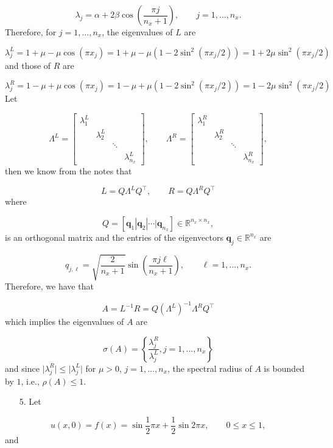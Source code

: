 \documentclass[12pt,a4paper]{article}
\begin{document}
\[
\lambda_j = \alpha + 2\beta\cos\left( \frac{\pi j}{n_x+1}  \right), \qquad j = 1, \ldots, n_x.
\]
Therefore, for $j = 1, \ldots, n_x$, the eigenvalues of $L$ are

\[
\lambda_j^{L} = 1 + \mu - \mu \cos\left(\pi x_j  \right) =  1 + \mu - \mu\left(1 - 2\sin^2\left(\pi x_j /2 \right)\right) = 1 + 2\mu\sin^2(\pi x_j/2)
\]
and those of $R$ are

\[
\lambda_j^{R} = 1 - \mu + \mu \cos\left(\pi x_j  \right) =  1 - \mu + \mu\left(1 - 2\sin^2\left(\pi x_j /2 \right)\right) = 1 - 2\mu\sin^2(\pi x_j/2)
\]
Let

\[
\Lambda^{L} = \begin{bmatrix}
\lambda_1^{L} & & & \\
& \lambda_2^{L} & & \\
 & & \ddots &  \\
&  & & \lambda_{n_x}^{L}
\end{bmatrix}, \qquad
\Lambda^{R} = \begin{bmatrix}
\lambda_1^{R} & & & \\
& \lambda_2^{R} & & \\
 & & \ddots &  \\
&  & & \lambda_{n_x}^{R}
\end{bmatrix},
\]
then we know from the notes that

\[
L = Q\Lambda^{L}Q^{\top}, \qquad R = Q\Lambda^{R}Q^{\top}
\]
where

\[
Q = \left[\mathbf{q}_1 |  \mathbf{q}_2 | \cdots | \mathbf{q}_{n_x}  \right] \in \mathbb{R}^{n_x \times n_x},
\]
is an orthogonal matrix and the entries of the eigenvectors $\mathbf{q}_j \in \mathbb{R}^{n_x}$ are

\[
q_{j,\ell} = \sqrt{\frac{2}{n_x+1}}\sin\left(\frac{\pi j \ell}{n_x+1}   \right), \qquad \ell = 1, \ldots, n_x.
\]
Therefore, we have that

\[
A = L^{-1}R = Q\left( \Lambda^{L}  \right)^{-1}\Lambda^{R}Q^{\top}
\]
which implies the eigenvalues of $A$ are

\[
\sigma(A) = \left\lbrace \frac{\lambda_j^{R}}{\lambda_j^{L}}, j = 1, \ldots, n_x    \right\rbrace
\]
and since $\vert \lambda_j^{R} \vert \leq \vert \lambda_j^{L} \vert$ for $\mu > 0$, $j = 1, \ldots, n_x$, the spectral radius of $A$ is bounded by $1$, i.e., $\rho(A) \leq 1$.

\begin{itemize}
\item[5. ] Let 

\end{itemize}
\[
u(x,0) = f(x) = \sin \frac{1}{2}\pi x + \frac{1}{2}\sin 2\pi x, \qquad 0 \leq x \leq 1, 
\]
and
\end{document}
